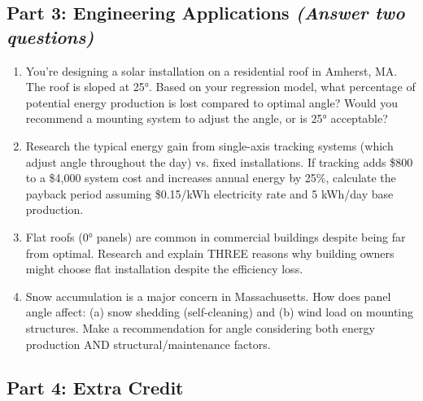 \documentclass[11pt,twoside]{article}
\numberwithin{equation}{section}
\newcommand{\?}{\stackrel{?}{=}}
\begin{document}
\subsection{Part 3: Engineering Applications  {\it (Answer two questions)} }
\begin{enumerate}[resume]

\item  You're designing a solar installation on a residential roof in Amherst, MA. The roof is sloped at 25°. Based on your regression model, what percentage of potential energy production is lost compared to optimal angle? Would you recommend a mounting system to adjust the angle, or is 25° acceptable?

\item Research the typical energy gain from single-axis tracking systems (which adjust angle throughout the day) vs. fixed installations. If tracking adds \$800 to a \$4,000 system cost and increases annual energy by 25\%, calculate the payback period assuming \$0.15/kWh electricity rate and 5 kWh/day base production.
 

 
\item Flat roofs (0° panels) are common in commercial buildings despite being far from optimal. Research and explain THREE reasons why building owners might choose flat installation despite the efficiency loss.

 
\item Snow accumulation is a major concern in Massachusetts. How does panel angle affect: (a) snow shedding (self-cleaning) and (b) wind load on mounting structures.
Make a recommendation for angle considering both energy production AND structural/maintenance factors.

\end{enumerate}

\subsection{Part 4: Extra Credit}
\end{document}
